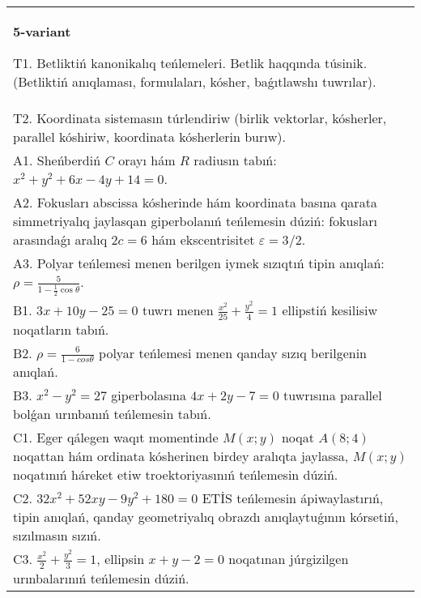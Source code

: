 \documentclass{article}
\begin{document}
\begin{tabular}{m{17cm}}
\textbf{5-variant}
\newline

T1. Betliktiń kanonikalıq teńlemeleri. Betlik haqqında túsinik. (Betliktiń anıqlaması, formulaları, kósher, baǵıtlawshı tuwrılar).\\

T2. Koordinata sistemasın túrlendiriw (birlik vektorlar, kósherler, parallel kóshiriw, koordinata kósherlerin burıw).\\

A1. Sheńberdiń $C$ orayı hám $R$ radiusın tabıń: $x^2+y^2+6 x-4 y+14=0$.\\

A2. Fokusları abscissa kósherinde hám koordinata basına qarata simmetriyalıq jaylasqan giperbolanıń teńlemesin dúziń: fokusları arasındaǵı aralıq $2 c=6$ hám ekscentrisitet $\varepsilon=3/2$.\\

A3. Polyar teńlemesi menen berilgen iymek sızıqtıń tipin anıqlań: $\rho=\frac{5}{1-\frac{1}{2}\cos\theta}$.\\

B1. $3x + 10y - 25 = 0$ tuwrı menen $\frac{x^{2}}{25} + \frac{y^{2}}{4} = 1$ ellipstiń kesilisiw noqatların tabıń.\\

B2. $\rho = \frac{6}{1 - cos\theta}$ polyar teńlemesi menen qanday sızıq berilgenin anıqlań.  \\

B3. $x^{2} - y^{2} = 27$ giperbolasına $4x + 2y - 7 = 0$ tuwrısına parallel bolǵan urınbanıń teńlemesin tabıń.  \\

C1. Eger qálegen waqıt momentinde $M(x;y)$ noqat $A(8;4)$ noqattan hám ordinata kósherinen birdey aralıqta jaylassa, $M(x;y)$ noqatınıń háreket etiw troektoriyasınıń teńlemesin dúziń.  \\

C2. $32x^{2} + 52xy - 9y^{2} + 180 = 0$ ETİS teńlemesin ápiwaylastırıń, tipin anıqlań, qanday geometriyalıq obrazdı anıqlaytuǵının kórsetiń, sızılmasın sızıń.  \\

C3. $\frac{x^{2}}{2} + \frac{y^{2}}{3} = 1$, ellipsin $x + y - 2 = 0$ noqatınan júrgizilgen urınbalarınıń teńlemesin dúziń.  \\

\end{tabular}
\vspace{1cm}
\end{document}
